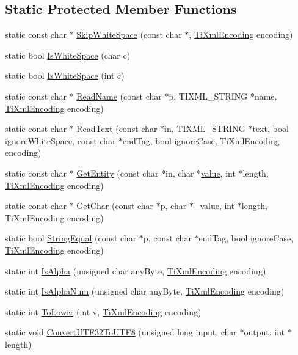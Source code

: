\subsection*{Static Protected Member Functions}
\begin{DoxyCompactItemize}
\item 
static const char $\ast$ \hyperlink{classTiXmlBase_ac0c3d66d8a9e6996a1fa016275e16875}{SkipWhiteSpace} (const char $\ast$, \hyperlink{tinyxml_8h_a88d51847a13ee0f4b4d320d03d2c4d96}{TiXmlEncoding} encoding)
\item 
static bool \hyperlink{classTiXmlBase_af56296d561c0bab4bc8e198cdcf5c48e}{IsWhiteSpace} (char c)
\item 
static bool \hyperlink{classTiXmlBase_a3de391ea9f4c4a8aa10d04480b048795}{IsWhiteSpace} (int c)
\item 
static const char $\ast$ \hyperlink{classTiXmlBase_a1c21a6ab5f7b503acd91f35f183734b3}{ReadName} (const char $\ast$p, TIXML\_\-STRING $\ast$name, \hyperlink{tinyxml_8h_a88d51847a13ee0f4b4d320d03d2c4d96}{TiXmlEncoding} encoding)
\item 
static const char $\ast$ \hyperlink{classTiXmlBase_aa646c74921aa33156968b802bbf5566e}{ReadText} (const char $\ast$in, TIXML\_\-STRING $\ast$text, bool ignoreWhiteSpace, const char $\ast$endTag, bool ignoreCase, \hyperlink{tinyxml_8h_a88d51847a13ee0f4b4d320d03d2c4d96}{TiXmlEncoding} encoding)
\item 
static const char $\ast$ \hyperlink{classTiXmlBase_ac5c08bf3deffcda0bf8ce2958372b584}{GetEntity} (const char $\ast$in, char $\ast$\hyperlink{classTiXmlNode_aead528b3cedc33c16a6c539872c7cc8b}{value}, int $\ast$length, \hyperlink{tinyxml_8h_a88d51847a13ee0f4b4d320d03d2c4d96}{TiXmlEncoding} encoding)
\item 
static const char $\ast$ \hyperlink{classTiXmlBase_a5b0fde72d6f662ae1fd6303195d2159b}{GetChar} (const char $\ast$p, char $\ast$\_\-value, int $\ast$length, \hyperlink{tinyxml_8h_a88d51847a13ee0f4b4d320d03d2c4d96}{TiXmlEncoding} encoding)
\item 
static bool \hyperlink{classTiXmlBase_a51631e6986179558b9e5850723ed165a}{StringEqual} (const char $\ast$p, const char $\ast$endTag, bool ignoreCase, \hyperlink{tinyxml_8h_a88d51847a13ee0f4b4d320d03d2c4d96}{TiXmlEncoding} encoding)
\item 
static int \hyperlink{classTiXmlBase_ae22522b2e8e1ac43102d16394f639fc8}{IsAlpha} (unsigned char anyByte, \hyperlink{tinyxml_8h_a88d51847a13ee0f4b4d320d03d2c4d96}{TiXmlEncoding} encoding)
\item 
static int \hyperlink{classTiXmlBase_a321919055c115c78ded17f85a793f368}{IsAlphaNum} (unsigned char anyByte, \hyperlink{tinyxml_8h_a88d51847a13ee0f4b4d320d03d2c4d96}{TiXmlEncoding} encoding)
\item 
static int \hyperlink{classTiXmlBase_a799f17405a86a5c2029618e85f11a097}{ToLower} (int v, \hyperlink{tinyxml_8h_a88d51847a13ee0f4b4d320d03d2c4d96}{TiXmlEncoding} encoding)
\item 
static void \hyperlink{classTiXmlBase_a07c765e3a7f979d343e646ea797b180b}{ConvertUTF32ToUTF8} (unsigned long input, char $\ast$output, int $\ast$length)
\end{DoxyCompactItemize}
